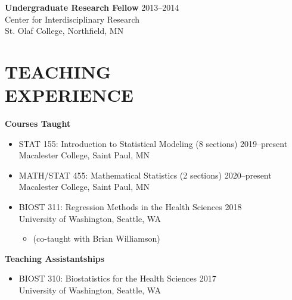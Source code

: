 \documentclass[margin]{res}
\begin{document}
\begin{resume}
\textbf{Undergraduate Research Fellow} \hfill 2013--2014 \\
Center for Interdisciplinary Research \\
St. Olaf College, Northfield, MN \\

\section{TEACHING \\ EXPERIENCE}

\textbf{Courses Taught} \vspace{0.1cm}
\begin{itemize}
\item STAT 155: Introduction to Statistical Modeling (8 sections) \hfill 2019--present \\
Macalester College, Saint Paul, MN

\item MATH/STAT 455: Mathematical Statistics (2 sections) \hfill 2020--present \\
Macalester College, Saint Paul, MN

\item BIOST 311: Regression Methods in the Health Sciences \hfill  2018 \\
University of Washington, Seattle, WA \vspace{-0.2cm}
\begin{itemize} 
				\item[] (co-taught with Brian Williamson)
				\end{itemize}
\end{itemize} 

\newpage

\textbf{Teaching Assistantships} 
\begin{itemize}
\item BIOST 310: Biostatistics for the Health Sciences  \hfill  2017 \\
University of Washington, Seattle, WA \vspace{0.1cm}


\end{itemize}
\end{resume}
\end{document}
